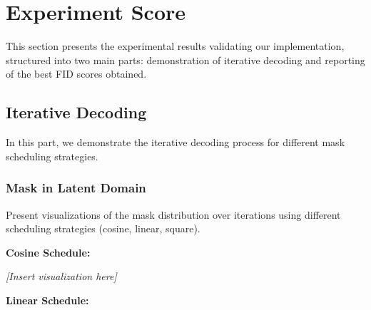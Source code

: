 \section{Experiment Score}
\label{sec:experiment}

This section presents the experimental results validating our implementation, structured into two main parts: demonstration of iterative decoding and reporting of the best FID scores obtained.

\subsection{Iterative Decoding}
In this part, we demonstrate the iterative decoding process for different mask scheduling strategies.

\subsubsection{Mask in Latent Domain}
Present visualizations of the mask distribution over iterations using different scheduling strategies (cosine, linear, square).

\begin{figure}[H]
    \centering
\end{figure}

\textbf{Cosine Schedule:}

\textit{[Insert visualization here]}

\textbf{Linear Schedule:}


